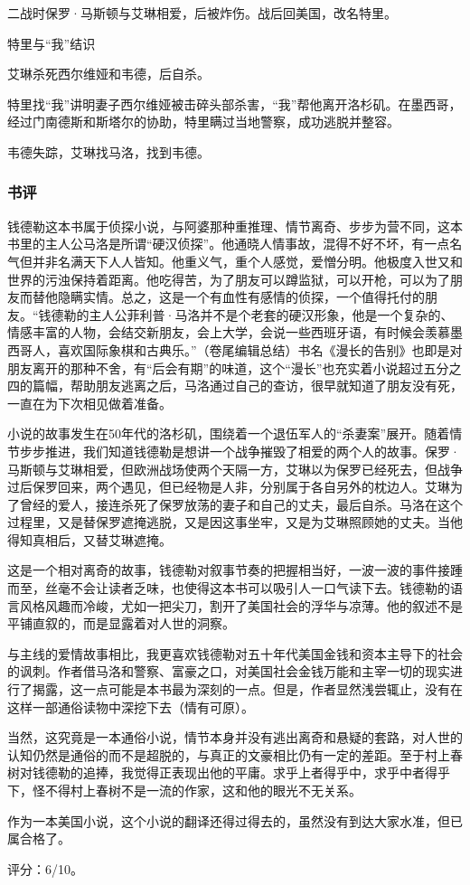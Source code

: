 \begin{itemize*}
    \item 二战时保罗·马斯顿与艾琳相爱，后被炸伤。战后回美国，改名特里。
    \item 特里与“我”结识
    \item 艾琳杀死西尔维娅和韦德，后自杀。
    \item 特里找“我”讲明妻子西尔维娅被击碎头部杀害，“我”帮他离开洛杉矶。在墨西哥，经过门南德斯和斯塔尔的协助，特里瞒过当地警察，成功逃脱并整容。
    \item 韦德失踪，艾琳找马洛，找到韦德。
\end{itemize*}

\subsubsection{书评}

钱德勒这本书属于侦探小说，与阿婆那种重推理、情节离奇、步步为营不同，这本书里的主人公马洛是所谓“硬汉侦探”。他通晓人情事故，混得不好不坏，有一点名气但并非名满天下人人皆知。他重义气，重个人感觉，爱憎分明。他极度入世又和世界的污浊保持着距离。他吃得苦，为了朋友可以蹲监狱，可以开枪，可以为了朋友而替他隐瞒实情。总之，这是一个有血性有感情的侦探，一个值得托付的朋友。“钱德勒的主人公菲利普·马洛并不是个老套的硬汉形象，他是一个复杂的、情感丰富的人物，会结交新朋友，会上大学，会说一些西班牙语，有时候会羡慕墨西哥人，喜欢国际象棋和古典乐。”（卷尾编辑总结）书名《漫长的告别》也即是对朋友离开的那种不舍，有“后会有期”的味道，这个“漫长”也充实着小说超过五分之四的篇幅，帮助朋友逃离之后，马洛通过自己的查访，很早就知道了朋友没有死，一直在为下次相见做着准备。

小说的故事发生在50年代的洛杉矶，围绕着一个退伍军人的“杀妻案”展开。随着情节步步推进，我们知道钱德勒是想讲一个战争摧毁了相爱的两个人的故事。保罗·马斯顿与艾琳相爱，但欧洲战场使两个天隔一方，艾琳以为保罗已经死去，但战争过后保罗回来，两个遇见，但已经物是人非，分别属于各自另外的枕边人。艾琳为了曾经的爱人，接连杀死了保罗放荡的妻子和自己的丈夫，最后自杀。马洛在这个过程里，又是替保罗遮掩逃脱，又是因这事坐牢，又是为艾琳照顾她的丈夫。当他得知真相后，又替艾琳遮掩。

这是一个相对离奇的故事，钱德勒对叙事节奏的把握相当好，一波一波的事件接踵而至，丝毫不会让读者乏味，也使得这本书可以吸引人一口气读下去。钱德勒的语言风格风趣而冷峻，尤如一把尖刀，割开了美国社会的浮华与凉薄。他的叙述不是平铺直叙的，而是显露着对人世的洞察。

与主线的爱情故事相比，我更喜欢钱德勒对五十年代美国金钱和资本主导下的社会的讽刺。作者借马洛和警察、富豪之口，对美国社会金钱万能和主宰一切的现实进行了揭露，这一点可能是本书最为深刻的一点。但是，作者显然浅尝辄止，没有在这样一部通俗读物中深挖下去（情有可原）。

当然，这究竟是一本通俗小说，情节本身并没有逃出离奇和悬疑的套路，对人世的认知仍然是通俗的而不是超脱的，与真正的文豪相比仍有一定的差距。至于村上春树对钱德勒的追捧，我觉得正表现出他的平庸。求乎上者得乎中，求乎中者得乎下，怪不得村上春树不是一流的作家，这和他的眼光不无关系。

作为一本美国小说，这个小说的翻译还得过得去的，虽然没有到达大家水准，但已属合格了。

评分：6/10。